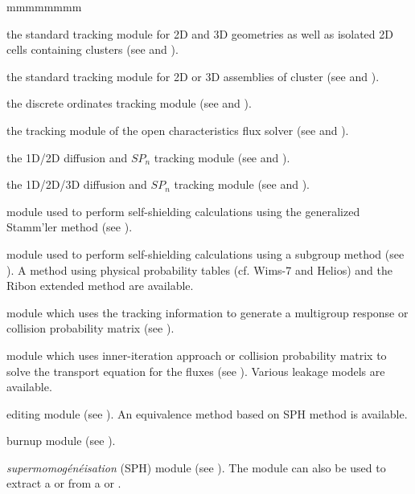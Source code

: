 \begin{ListeDeDescription}{mmmmmmmm}
\item[\moc{EXCELT:}] the standard tracking module for 2D and 3D geometries as well as isolated 2D 
cells containing clusters (see  and ).

\item[\moc{NXT:}] the standard tracking module for 2D or 3D assemblies of cluster (see
 and ).

\item[\moc{SNT:}] the discrete ordinates tracking module (see
 and ).

\item[\moc{MCCGT:}] the tracking module of the open characteristics flux
solver (see  and ).

\item[\moc{BIVACT:}] the 1D/2D diffusion and $SP_n$ tracking module (see
 and ).

\item[\moc{TRIVAT:}] the 1D/2D/3D diffusion and $SP_n$ tracking module (see
 and ).

\item[\moc{SHI:}] module used to perform self-shielding calculations
using the generalized Stamm'ler method (see ).

\item[\moc{USS:}] module used to perform self-shielding calculations
using a subgroup method (see ). A method using physical
probability tables (cf. Wims-7 and Helios) and the Ribon extended method
are available.

\item[\moc{ASM:}] module which uses the tracking information to
generate a multigroup response or collision probability matrix (see
).

\item[\moc{FLU:}] module which uses inner-iteration approach or
collision probability matrix to solve the transport equation for the fluxes
(see ). Various leakage models are available.

\item[\moc{EDI:}] editing module (see ). An equivalence method based
on SPH method is available.

\item[\moc{EVO:}] burnup module (see ).

\item[\moc{SPH:}] {\sl supermomog\'en\'eisation} (SPH) module (see ). The 
module can also be used to extract a  or  from a  or .


\end{ListeDeDescription}
